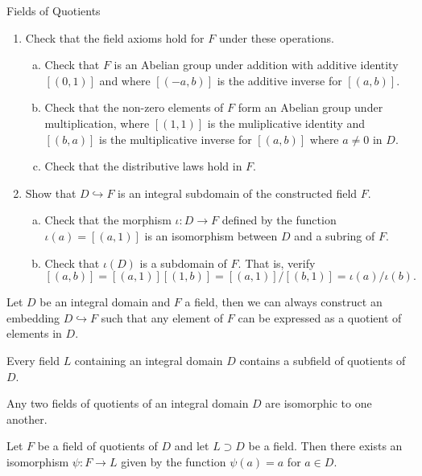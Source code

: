 \begin{section}{Fields of Quotients}
\begin{prop}
\begin{enumerate}[(1)]
\begin{enumerate}[(a)]
\end{enumerate} %
\item Check that the field axioms hold for $F$ under these operations.
\begin{enumerate}[(a)] %
\item Check that $F$ is an Abelian group under addition with additive identity $[(0,1)]$ and where $[(-a,b)]$ is the additive inverse for $[(a,b)]$.
\item Check that the non-zero elements of $F$ form an Abelian group under multiplication, where $[(1,1)]$ is the muliplicative identity and $[(b,a)]$ is the multiplicative inverse for $[(a,b)]$ where $a \neq 0$ in $D$.
\item Check that the distributive laws hold in $F$.
\end{enumerate} %
\item Show that $D \hookrightarrow F$ is an integral subdomain of the constructed field $F$.
\begin{enumerate}[(a)] %
\item Check that the morphism $\iota \colon D \to F$ defined by the function $\iota(a) = [(a,1)]$ is an isomorphism between $D$ and a subring of $F$.
\item Check that $\iota(D)$ is a subdomain of $F$. That is, verify
$$[(a,b)] = [(a,1)][(1,b)] = [(a,1)]/[(b,1)] = \iota(a)/\iota(b).$$
\end{enumerate} %
\end{enumerate}
\end{prop}

\begin{thm}
Let $D$ be an integral domain and $F$ a field, then we can always construct an embedding $D \hookrightarrow F$ such that any element of $F$ can be expressed as a quotient of elements in $D$.
\end{thm}

\begin{prop}
Every field $L$ containing an integral domain $D$ contains a subfield of quotients of $D$.
\end{prop}

\begin{prop}
Any two fields of quotients of an integral domain $D$ are isomorphic to one another.
\end{prop}

\begin{thm}
Let $F$ be a field of quotients of $D$ and let $L \supset D$ be a field. Then there exists an isomorphism $\psi \colon F \to L$ given by the function $\psi(a) = a$ for $a \in D$.
\end{thm}

\end{section}